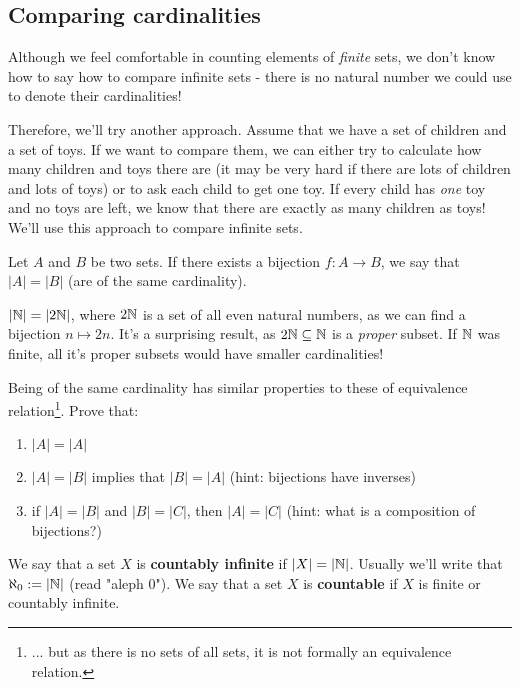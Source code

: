\subsection{Comparing cardinalities}
Although we feel comfortable in counting elements of \textit{finite} sets, we don't know how to say how to compare infinite sets - there is no natural number we could use to denote
their cardinalities!

Therefore, we'll try another approach. Assume that we have a set of children and a set of toys. If we want to compare them, we can either try to calculate how many children and toys there are (it may be very hard if there are lots of children and lots of toys) or to ask each child to get one toy. If every child has \textit{one} toy and no toys are left, we know
that there are exactly as many children as toys! We'll use this approach to compare infinite sets.

\begin{definition}
  Let $A$ and $B$ be two sets. If there exists a bijection $f:A\to B$, we say that $|A|=|B|$ (are of the same cardinality).
\end{definition}

\begin{example}
  $|\mathbb N|=|2\mathbb N|$, where $2\mathbb N$ is a set of all even natural numbers, as we can find a bijection $n\mapsto 2n$. It's a surprising result, as $2\mathbb N\subseteq \mathbb N$ is a \textit{proper} subset. If $\mathbb N$ was finite, all it's proper subsets would have smaller cardinalities!
\end{example}

\begin{exercise}
  Being of the same cardinality has similar properties to these of equivalence relation\footnote{... but as there is no sets of all sets, it is not formally an equivalence relation.}. Prove that:
  \begin{enumerate}
    \item $|A|=|A|$
    \item $|A|=|B|$ implies that $|B|=|A|$ (hint: bijections have inverses)
    \item if $|A|=|B|$ and $|B|=|C|$, then $|A|=|C|$ (hint: what is a composition of bijections?)
  \end{enumerate}
\end{exercise}

\begin{definition}
  We say that a set $X$ is \textbf{countably infinite} if $|X|=|\mathbb N|$. Usually we'll write that $\aleph_0:=|\mathbb N|$ (read "aleph 0").
  We say that a set $X$ is \textbf{countable} if $X$ is finite or countably infinite.
\end{definition}

